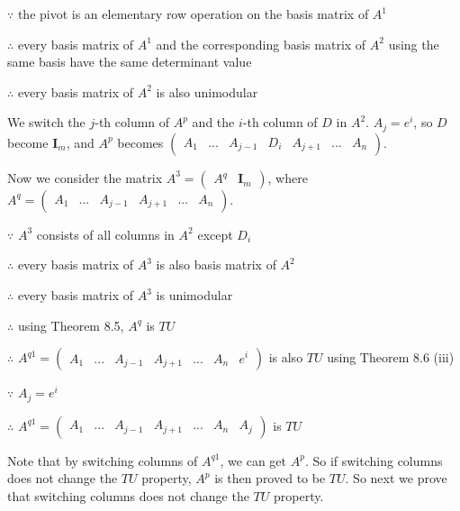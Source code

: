 $\because$ the pivot is an elementary row operation on the basis matrix of $A^1$

$\therefore$ every basis matrix of $A^1$ and the corresponding basis matrix of $A^2$ using the same basis have the same determinant value

$\therefore$ every basis matrix of $A^2$ is also unimodular

We switch the $j$-th column of $A^p$ and the $i$-th column of $D$ in $A^2$. $A_j=e^i$, so $D$ become $\textbf{I}_m$, and $A^p$ becomes $\left(\begin{array}{ccccccc} A_1 & ... & A_{j-1} & D_i & A_{j+1} & ... & A_n \end{array}\right)$. 

Now we consider the matrix $A^3=\left( \begin{array}{cc} A^q & \textbf{I}_m \end{array}\right)$, where $A^q=\left(\begin{array}{cccccc} A_1 & ... & A_{j-1} & A_{j+1} & ... & A_n \end{array}\right)$.

$\because$ $A^3$ consists of all columns in $A^2$ except $D_i$

$\therefore$ every basis matrix of $A^3$ is also basis matrix of $A^2$

$\therefore$ every basis matrix of $A^3$ is unimodular

$\therefore$ using Theorem 8.5, $A^q$ is $TU$

$\therefore$ $A^{q1}=\left(\begin{array}{ccccccc} A_1 & ... & A_{j-1} & A_{j+1} & ... & A_n & e^i \end{array}\right)$ is also $TU$ using Theorem 8.6 (iii)

$\because$ $A_j=e^i$

$\therefore$  $A^{q1}=\left(\begin{array}{ccccccc} A_1 & ... & A_{j-1} & A_{j+1} & ... & A_n & A_j \end{array}\right)$ is $TU$

Note that by switching columns of $A^{q1}$, we can get $A^p$. So if switching columns does not change the $TU$ property, $A^p$ is then proved to be $TU$. So next we prove that switching columns does not change the $TU$ property.


